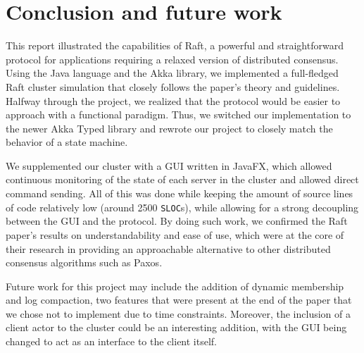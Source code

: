 \section{Conclusion and future work}
\label{conclusion}

This report illustrated the capabilities of Raft, a powerful and straightforward protocol for applications requiring a relaxed version of distributed consensus. Using the Java language and the Akka library, we implemented a full-fledged Raft cluster simulation that closely follows the paper's theory and guidelines. Halfway through the project, we realized that the protocol would be easier to approach with a functional paradigm. Thus, we switched our implementation to the newer Akka Typed library and rewrote our project to closely match the behavior of a state machine.

We supplemented our cluster with a GUI written in JavaFX, which allowed continuous monitoring of the state of each server in the cluster and allowed direct command sending. All of this was done while keeping the amount of source lines of code relatively low (around 2500 \texttt{SLOC}s), while allowing for a strong decoupling between the GUI and the protocol. By doing such work, we confirmed the Raft paper's results on understandability and ease of use, which were at the core of their research in providing an approachable alternative to other distributed consensus algorithms such as Paxos.

Future work for this project may include the addition of dynamic membership and log compaction, two features that were present at the end of the paper that we chose not to implement due to time constraints. Moreover, the inclusion of a client actor to the cluster could be an interesting addition, with the GUI being changed to act as an interface to the client itself.
